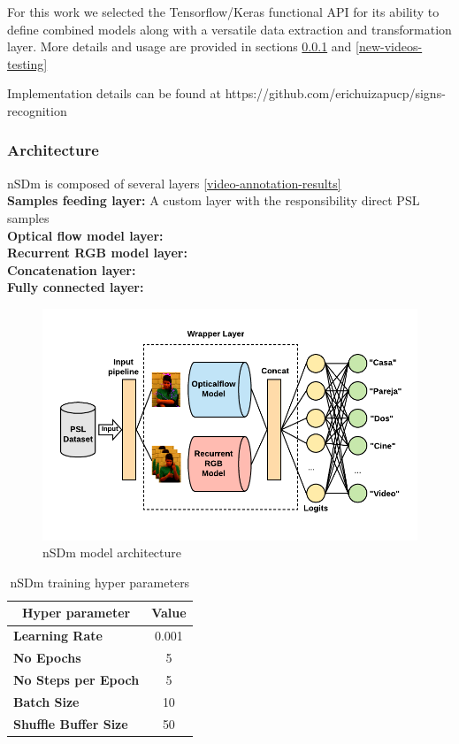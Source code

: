 \documentclass[twocolumn,conference]{article}
\begin{document}
For this work we selected the Tensorflow/Keras functional API for its ability to define combined models along with a versatile data extraction and transformation layer. More details and usage are provided in sections \ref{nsdm-architecture} and \ref{new-videos-testing}

Implementation details can be found at https://github.com/erichuizapucp/signs-recognition
\subsubsection{Architecture}\label{nsdm-architecture}
nSDm is composed of several layers \ref{video-annotation-results}\\
\textbf{Samples feeding layer:} A custom layer with the responsibility direct PSL samples \\
\textbf{Optical flow model layer:} \\
\textbf{Recurrent RGB model layer:} \\
\textbf{Concatenation layer:} \\
\textbf{Fully connected layer:} \\

\begin{figure}[hbt!]
\includegraphics[width=\linewidth]{images/nsdm-model-architecture.png}
\caption{nSDm model architecture}
\label{fig:opticalflow-two}
\end{figure}

\begin{table}[!htb]
\captionsetup{size=footnotesize}
\begin{tabular}{ p{16em} c}
\toprule
\multicolumn{1}{c}{\textbf{Hyper parameter}} & 
	\multicolumn{1}{c}{\textbf{Value}}\\
\midrule
\textbf{Learning Rate}&	0.001\\
\textbf{No Epochs}&	5\\
\textbf{No Steps per Epoch}&	5\\
\textbf{Batch Size}&	10\\
\textbf{Shuffle Buffer Size}&	50\\
\bottomrule
\end{tabular}
\caption{nSDm training hyper parameters} \label{tab:nSDm-hyperparams}
\end{table}
\end{document}
